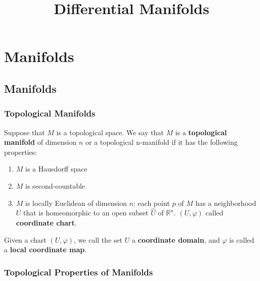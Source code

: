 \documentclass[12pt, oneside]{book}
\begin{document}
\frontmatter
\title{{\Huge{\textbf{Differential Manifolds}}}}
\maketitle
{}
\tableofcontents %


\mainmatter


\chapter{Manifolds}

\section{Manifolds} %

\subsection{Topological Manifolds}  %
\begin{definition}
    Suppose that $M$ is a topological space. We say that $M$ is a \textbf{topological manifold} of dimension $n$ or a topological n-manifold if it has the following properties:
    \begin{enumerate}[label=(\roman*)]
        \item $M$ is a Hausdorff space
        \item $M$ is second-countable
        \item $M$ is locally Euclidean of dimension $n$: each point $p$ of $M$ has a neighborhood $U$ that is homeomorphic to an open subset $\widehat{U}$ of $\mathbb{R}^n$. $\left(U,\varphi\right)$ called \textbf{coordinate chart}.
    \end{enumerate}
    Given a chart $(U, \varphi)$, we call the set $U$ a \textbf{coordinate domain}, and $\varphi$ is called a \textbf{local coordinate map}.
\end{definition}





\subsection{Topological Properties of Manifolds}
\end{document}
